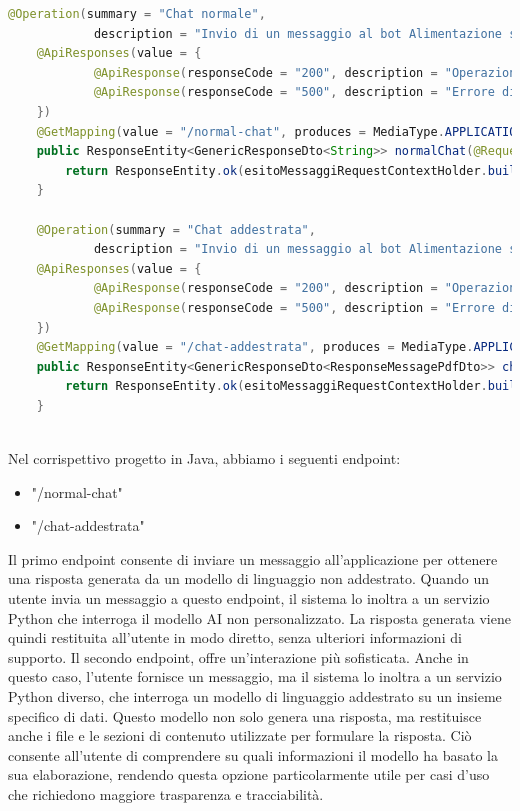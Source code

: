 \documentclass[a4paper,twoside,12pt]{toptesi}
\begin{document}
\begin{lstlisting}[language=Java, caption=Microservizio Java]
@Operation(summary = "Chat normale",
            description = "Invio di un messaggio al bot Alimentazione sfruttando l'LLM non addestrato")
    @ApiResponses(value = {
            @ApiResponse(responseCode = "200", description = "Operazione andata a buon fine"),
            @ApiResponse(responseCode = "500", description = "Errore di sistema")
    })
    @GetMapping(value = "/normal-chat", produces = MediaType.APPLICATION_JSON_VALUE)
    public ResponseEntity<GenericResponseDto<String>> normalChat(@RequestParam String messagge) {
        return ResponseEntity.ok(esitoMessaggiRequestContextHolder.buildGenericResponse(chatService.normalChat(messagge)));
    }

    @Operation(summary = "Chat addestrata",
            description = "Invio di un messaggio al bot Alimentazione sfruttando l'LLM addestrato")
    @ApiResponses(value = {
            @ApiResponse(responseCode = "200", description = "Operazione andata a buon fine"),
            @ApiResponse(responseCode = "500", description = "Errore di sistema")
    })
    @GetMapping(value = "/chat-addestrata", produces = MediaType.APPLICATION_JSON_VALUE)
    public ResponseEntity<GenericResponseDto<ResponseMessagePdfDto>> chatAddestrata(@RequestParam String messagge) {
        return ResponseEntity.ok(esitoMessaggiRequestContextHolder.buildGenericResponse(chatService.chatAddestrata(messagge)));
    }
        
\end{lstlisting}

Nel corrispettivo progetto in Java, abbiamo i seguenti endpoint:
\begin{itemize}
\item "/normal-chat"
\item "/chat-addestrata"
\end{itemize}

Il primo endpoint consente di inviare un messaggio all'applicazione per ottenere una risposta generata da un modello di linguaggio non addestrato. Quando un utente invia un messaggio a questo endpoint, il sistema lo inoltra a un servizio Python che interroga il modello AI non personalizzato. La risposta generata viene quindi restituita all'utente in modo diretto, senza ulteriori informazioni di supporto. Il secondo endpoint, offre un'interazione più sofisticata. Anche in questo caso, l'utente fornisce un messaggio, ma il sistema lo inoltra a un servizio Python diverso, che interroga un modello di linguaggio addestrato su un insieme specifico di dati. Questo modello non solo genera una risposta, ma restituisce anche i file e le sezioni di contenuto utilizzate per formulare la risposta. Ciò consente all'utente di comprendere su quali informazioni il modello ha basato la sua elaborazione, rendendo questa opzione particolarmente utile per casi d'uso che richiedono maggiore trasparenza e tracciabilità.
\end{document}
